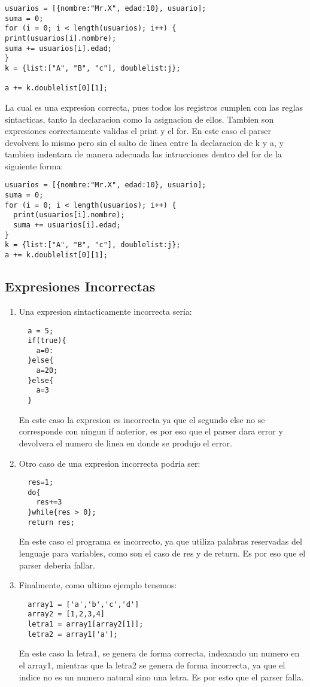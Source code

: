 \begin{enumerate}
\begin{verbatim}
usuarios = [{nombre:"Mr.X", edad:10}, usuario];
suma = 0;
for (i = 0; i < length(usuarios); i++) {
print(usuarios[i].nombre);
suma += usuarios[i].edad;
}
k = {list:["A", "B", "c"], doublelist:j};

a += k.doublelist[0][1];
\end{verbatim}
La cual es una expresion correcta, pues todos los registros cumplen con las
reglas sintacticas, tanto la declaracion como la asignacion de ellos. Tambien
son expresiones correctamente validas el print y el for. En este caso el parser
devolvera lo mismo pero sin el salto de linea entre la declaracion de k y a, y
tambien indentara de manera adecuada las intrucciones dentro del for de la
siguiente forma:

\begin{verbatim}
usuarios = [{nombre:"Mr.X", edad:10}, usuario];
suma = 0;
for (i = 0; i < length(usuarios); i++) {
  print(usuarios[i].nombre);
  suma += usuarios[i].edad;
}
k = {list:["A", "B", "c"], doublelist:j};
a += k.doublelist[0][1];
\end{verbatim}

\end{enumerate}

\subsection{Expresiones Incorrectas}

\begin{enumerate}
\item Una expresion sintacticamente incorrecta sería:
  \begin{verbatim}
  a = 5;
  if(true){
    a=0:
  }else{
    a=20;
  }else{
    a=3
  }
  \end{verbatim}
  En este caso la expresion es incorrecta ya que el segundo else no se
  corresponde con ningun if anterior, es por eso que el parser dara error y
  devolvera el numero de linea en donde se produjo el error.

\item Otro caso de una expresion incorrecta podria ser:
  \begin{verbatim}
  res=1;
  do{
    res+=3
  }while{res > 0};
  return res;
  \end{verbatim}
  En este caso el programa es incorrecto, ya que utiliza palabras reservadas
  del lenguaje para variables, como son el caso de res y de return. Es por eso
  que el parser deberia fallar.
\item Finalmente, como ultimo ejemplo tenemos:
  \begin{verbatim}
  array1 = ['a','b','c','d']
  array2 = [1,2,3,4]
  letra1 = array1[array2[1]];
  letra2 = array1['a'];
  \end{verbatim}
  En este caso la letra1, se genera de forma correcta, indexando un numero en
  el array1, mientras que la letra2 se genera de forma incorrecta, ya que el
  indice no es un numero natural sino una letra. Es por esto que el parser
  falla.
\end{enumerate}


